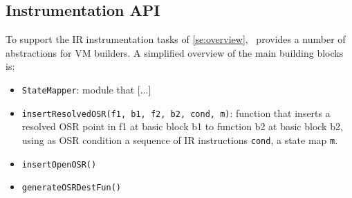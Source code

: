 \subsection{Instrumentation API}
\label{se:instrum-api}
To support the IR instrumentation tasks of \mysection\ref{se:overview}, \osrkit\ provides a number of abstractions for VM builders. A simplified overview of the main building blocks is:
\begin{itemize}
\item {\tt StateMapper}: module that [...]
\item {\tt insertResolvedOSR(f1, b1, f2, b2, cond, m)}: function that inserts a resolved OSR point in f1 at basic block b1 to function b2 at basic block b2, using as OSR condition a sequence of IR instructions {\tt cond}, a state map {\tt m}.
\item {\tt insertOpenOSR()}
\item {\tt generateOSRDestFun()}
\end{itemize}
                              







  

  
  
  
  